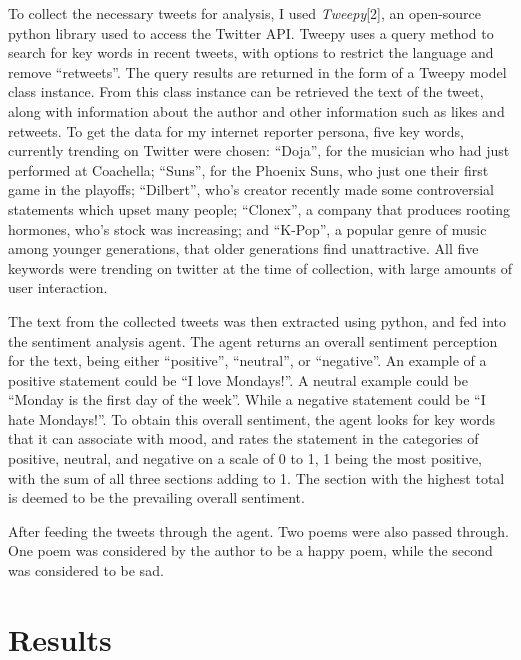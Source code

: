 \documentclass[]{article}
\begin{document}
    To collect the necessary tweets for analysis, I used \textit{Tweepy}[2], an open-source python library used 
    to access the Twitter API. Tweepy uses a query method to search for key words in recent tweets, with options
    to restrict the language and remove ``retweets''. The query results are returned in the form of a Tweepy model
    class instance. From this class instance can be retrieved the text of the tweet, along with information about 
    the author and other information such as likes and retweets. To get the data for my internet reporter persona, 
    five key words, currently trending on Twitter were chosen: ``Doja'', for the musician who had just performed at 
    Coachella; ``Suns'', for the Phoenix Suns, who just one their first game in the playoffs; ``Dilbert'', who's creator
    recently made some controversial statements which upset many people; ``Clonex'', a company that produces rooting 
    hormones, who's stock was increasing; and ``K-Pop'', a popular genre of music among younger generations, that
    older generations find unattractive. All five keywords were trending on twitter at the time of collection, with 
    large amounts of user interaction.

    The text from the collected tweets was then extracted using python, and fed into the sentiment analysis agent. The
    agent returns an overall sentiment perception for the text, being either ``positive'', ``neutral'', or ``negative''.
    An example of a positive statement could be ``I love Mondays!''. A neutral example could be ``Monday is the first
    day of the week''. While a negative statement could be ``I hate Mondays!''. To obtain this overall sentiment, the agent looks for key words that it 
    can associate with mood, and rates the statement in the categories of positive, neutral, and negative on a scale of 
    0 to 1, 1 being the most positive, with the sum of all three sections adding to 1. The section with the highest total 
    is deemed to be the prevailing overall sentiment.

    After feeding the tweets through the agent. Two poems were also passed through. One poem was considered by the 
    author to be a happy poem, while the second was considered to be sad.

    \section{Results}
\end{document}
